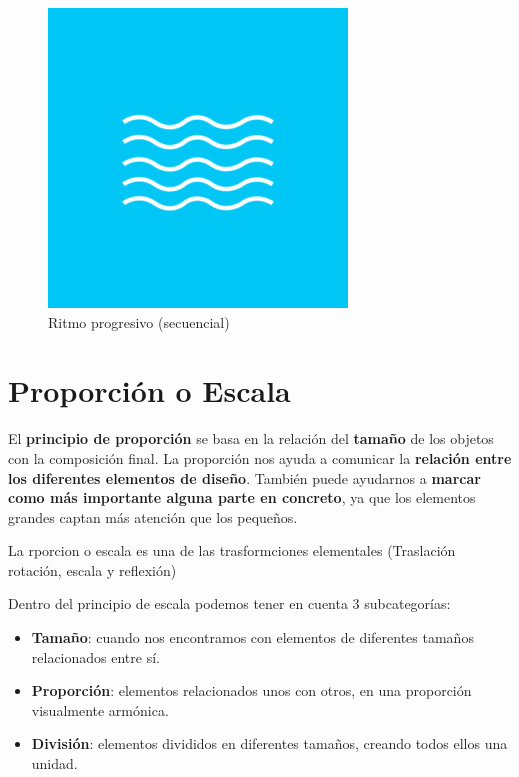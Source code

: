 \documentclass[16pt,]{krantz}
\theoremstyle{definition}
\theoremstyle{definition}
\theoremstyle{definition}
\theoremstyle{definition}
\theoremstyle{remark}
\begin{document}
\begin{figure}

{\centering \includegraphics[width=1\linewidth,height=1\textheight]{ritmoo} 

}

\caption{Ritmo progresivo (secuencial)}\label{fig:rythmm}
\end{figure}

\hypertarget{proporciuxf3n-o-escala}{%
\section{Proporción o Escala}\label{proporciuxf3n-o-escala}}

El \textbf{principio de proporción} se basa en la relación del \textbf{tamaño} de los objetos con la composición final. La proporción nos ayuda a comunicar la \textbf{relación entre los diferentes elementos de diseño}. También puede ayudarnos a \textbf{marcar como más importante alguna parte en concreto}, ya que los elementos grandes captan más atención que los pequeños.

La rporcion o escala es una de las trasformciones elementales (Traslación rotación, escala y reflexión)

Dentro del principio de escala podemos tener en cuenta 3 subcategorías:

\begin{itemize}
\item
  \textbf{Tamaño}: cuando nos encontramos con elementos de diferentes tamaños relacionados entre sí.
\item
  \textbf{Proporción}: elementos relacionados unos con otros, en una proporción visualmente armónica.
\item
  \textbf{División}: elementos divididos en diferentes tamaños, creando todos ellos una unidad.
\end{itemize}
\end{document}
